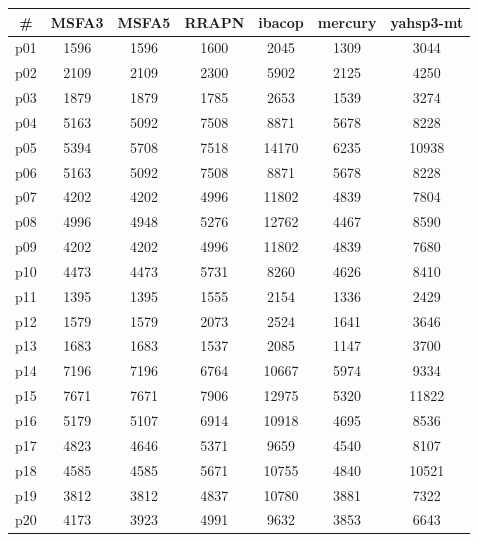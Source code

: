 \begin{tabular}{c||c|c|c|c|c|c}
\textbf{\#} & \textbf{MSFA3} & \textbf{MSFA5} & \textbf{RRAPN} & \textbf{ibacop} & \textbf{mercury} & \textbf{yahsp3-mt}\\
\hline
\hline
p01 & 1596 & 1596 & 1600 & 2045 & 1309 & 3044\\
p02 & 2109 & 2109 & 2300 & 5902 & 2125 & 4250\\
p03 & 1879 & 1879 & 1785 & 2653 & 1539 & 3274\\
p04 & 5163 & 5092 & 7508 & 8871 & 5678 & 8228\\
p05 & 5394 & 5708 & 7518 & 14170 & 6235 & 10938\\
p06 & 5163 & 5092 & 7508 & 8871 & 5678 & 8228\\
p07 & 4202 & 4202 & 4996 & 11802 & 4839 & 7804\\
p08 & 4996 & 4948 & 5276 & 12762 & 4467 & 8590\\
p09 & 4202 & 4202 & 4996 & 11802 & 4839 & 7680\\
p10 & 4473 & 4473 & 5731 & 8260 & 4626 & 8410\\
p11 & 1395 & 1395 & 1555 & 2154 & 1336 & 2429\\
p12 & 1579 & 1579 & 2073 & 2524 & 1641 & 3646\\
p13 & 1683 & 1683 & 1537 & 2085 & 1147 & 3700\\
p14 & 7196 & 7196 & 6764 & 10667 & 5974 & 9334\\
p15 & 7671 & 7671 & 7906 & 12975 & 5320 & 11822\\
p16 & 5179 & 5107 & 6914 & 10918 & 4695 & 8536\\
p17 & 4823 & 4646 & 5371 & 9659 & 4540 & 8107\\
p18 & 4585 & 4585 & 5671 & 10755 & 4840 & 10521\\
p19 & 3812 & 3812 & 4837 & 10780 & 3881 & 7322\\
p20 & 4173 & 3923 & 4991 & 9632 & 3853 & 6643\\
\end{tabular}

